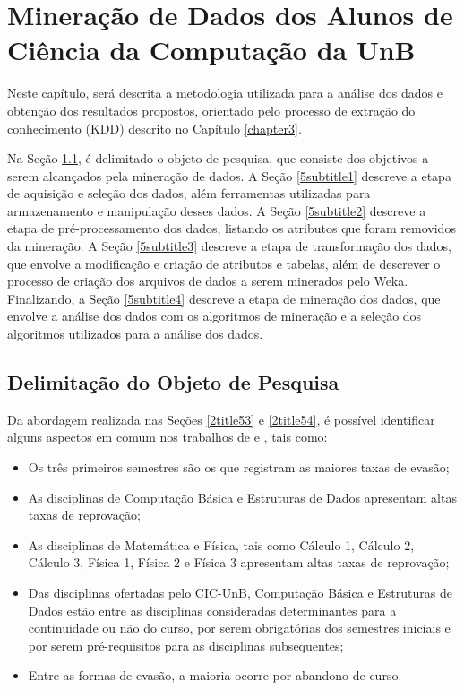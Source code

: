 
\chapter{Mineração de Dados dos Alunos de Ciência da Computação da UnB} \label{chapter5}

Neste capítulo, será descrita a metodologia utilizada para a análise dos dados e obtenção dos resultados propostos, orientado pelo processo de extração do conhecimento (KDD) descrito no Capítulo \ref{chapter3}.

Na Seção \ref{5title1}, é delimitado o objeto de pesquisa, que consiste dos objetivos a serem alcançados pela mineração de dados. A Seção \ref{5subtitle1} descreve a etapa de aquisição e seleção dos dados, além ferramentas utilizadas para armazenamento e manipulação desses dados. A Seção \ref{5subtitle2} descreve a etapa de pré-processamento dos dados, listando os atributos que foram removidos da mineração. A Seção \ref{5subtitle3} descreve a etapa de transformação dos dados, que envolve a modificação e criação de atributos e tabelas, além de descrever o processo de criação dos arquivos de dados a serem minerados pelo Weka. Finalizando, a Seção \ref{5subtitle4} descreve a etapa de mineração dos dados, que envolve a análise dos dados com os algoritmos de mineração e a seleção dos algoritmos utilizados para a análise dos dados.

\section{Delimitação do Objeto de Pesquisa} \label{5title1}

Da abordagem realizada nas Seções \ref{2title53} e \ref{2title54}, é possível identificar alguns aspectos em comum nos trabalhos de \citet{dantas2014} e \citet{palmeira_santos2014}, tais como:

\begin{itemize}
	\item Os três primeiros semestres são os que registram as maiores taxas de evasão;
	\item As disciplinas de Computação Básica e Estruturas de Dados apresentam altas taxas de reprovação;
	\item As disciplinas de Matemática e Física, tais como Cálculo 1, Cálculo 2, Cálculo 3, Física 1, Física 2 e Física 3 apresentam altas taxas de reprovação;
	\item Das disciplinas ofertadas pelo CIC-UnB, Computação Básica e Estruturas de Dados estão entre as disciplinas consideradas determinantes para a continuidade ou não do curso, por serem obrigatórias dos semestres iniciais e por serem pré-requisitos para as disciplinas subsequentes;
	\item Entre as formas de evasão, a maioria ocorre por abandono de curso.
\end{itemize}

